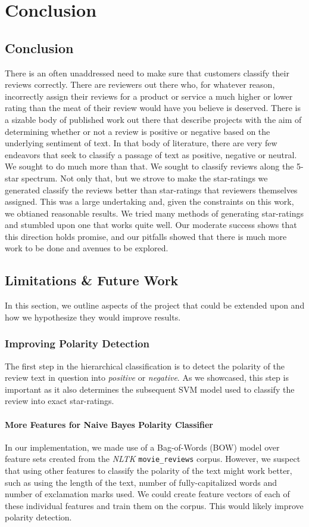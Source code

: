 \documentclass[11pt]{report} %
\begin{document}
\chapter{Conclusion}

\section{Conclusion}
There is an often unaddressed need to make sure that customers classify their reviews correctly. There are reviewers out there who, for whatever reason, incorrectly assign their reviews for a product or service a much higher or lower rating than the meat of their review would have you believe is deserved. There is a sizable body of published work out there that describe projects with the aim of determining whether or not a review is positive or negative based on the underlying sentiment of text. In that body of literature, there are very few endeavors that seek to classify a passage of text as positive, negative or neutral. We sought to do much more than that. We sought to classify reviews along the 5-star spectrum. Not only that, but we strove to make the star-ratings we generated classify the reviews better than star-ratings that reviewers themselves assigned. This was a large undertaking and, given the constraints on this work, we obtianed reasonable results. We tried many methods of generating star-ratings and stumbled upon one that works quite well. Our moderate success shows that this direction holds promise, and our pitfalls showed that there is much more work to be done and avenues to be explored. 

\section{Limitations \& Future Work}
In this section, we outline aspects of the project that could be extended upon and how we hypothesize they would improve results. 
\subsection{Improving Polarity Detection}
The first step in the hierarchical classification is to detect the polarity of the review text in question into \textit{positive} or \textit{negative}. As we showcased, this step is important as it also determines the subsequent SVM model used to classify the review into exact star-ratings.
\subsubsection{More Features for Naive Bayes Polarity Classifier}
 In our implementation, we made use of a Bag-of-Words (BOW) model over feature sets created from the \textit{NLTK} \verb|movie_reviews| corpus. However, we suspect that using other features to classify the polarity of the text might work better, such as using the length of the text, number of fully-capitalized words and number of exclamation marks used. We could create feature vectors of each of these individual features and train them on the corpus. This would likely improve polarity detection.
\end{document}

